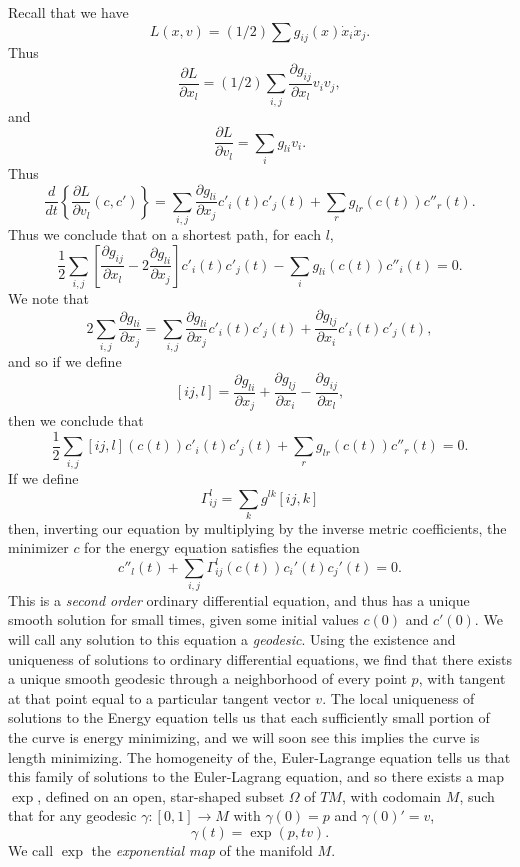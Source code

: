 \begin{comment}
\end{comment}

Recall that we have
%
\[ L(x,v) = (1/2) \sum g_{ij}(x) \dot{x}_i \dot{x}_j. \]
%
Thus
%
\[ \frac{\partial L}{\partial x_l} = (1/2) \sum_{i,j} \frac{\partial g_{ij}}{\partial x_l} v_i v_j, \]
%
and
%
\[ \frac{\partial L}{\partial v_l} = \sum_i g_{li} v_i. \]
%
Thus
%
\[ \frac{d}{dt} \left\{ \frac{\partial L}{\partial v_l}(c,c') \right\} = \sum_{i,j} \frac{\partial g_{li}}{\partial x_j} c'_i(t) c'_j(t) + \sum_r g_{lr}(c(t)) c''_r(t). \]
%
Thus we conclude that on a shortest path, for each $l$,
%
\[ \frac{1}{2} \sum_{i,j} \left[ \frac{\partial g_{ij}}{\partial x_l} - 2 \frac{\partial g_{li}}{\partial x_j} \right] c'_i(t) c'_j(t) - \sum_i g_{li}(c(t)) c''_i(t) = 0. \]
%
We note that
%
\[ 2 \sum_{i,j} \frac{\partial g_{li}}{\partial x_j} = \sum_{i,j} \frac{\partial g_{li}}{\partial x_j} c'_i(t) c'_j(t) + \frac{\partial g_{lj}}{\partial x_i} c'_i(t) c'_j(t), \]
%
and so if we define
%
\[ [ij,l] = \frac{\partial g_{li}}{\partial x_j} + \frac{\partial g_{lj}}{\partial x_i} - \frac{\partial g_{ij}}{\partial x_l}, \]
%
then we conclude that
%
\[ \frac{1}{2} \sum_{i,j} [ij,l](c(t)) c'_i(t) c'_j(t) + \sum_r g_{lr}(c(t)) c''_r(t) = 0. \]
%
If we define
%
\[ \Gamma^l_{ij} = \sum_k g^{lk} [ij,k] \]
%
then, inverting our equation by multiplying by the inverse metric coefficients, the minimizer $c$ for the energy equation satisfies the equation
%
\[ c''_l(t) + \sum_{i,j} \Gamma^l_{ij}(c(t)) c_i'(t) c_j'(t) = 0. \]
%
This is a \emph{second order} ordinary differential equation, and thus has a unique smooth solution for small times, given some initial values $c(0)$ and $c'(0)$. We will call any solution to this equation a \emph{geodesic}. Using the existence and uniqueness of solutions to ordinary differential equations, we find that there exists a unique smooth geodesic through a neighborhood of every point $p$, with tangent at that point equal to a particular tangent vector $v$. The local uniqueness of solutions to the Energy equation tells us that each sufficiently small portion of the curve is energy minimizing, and we will soon see this implies the curve is length minimizing. The homogeneity of the, Euler-Lagrange equation tells us that this family of solutions to the Euler-Lagrang equation, and so there exists a map $\exp$, defined on an open, star-shaped subset $\Omega$ of $TM$, with codomain $M$, such that for any geodesic $\gamma: [0,1] \to M$ with $\gamma(0) = p$ and $\gamma(0)' = v$,
%
\[ \gamma(t) = \exp(p,tv). \]
%
We call $\exp$ the \emph{exponential map} of the manifold $M$.


